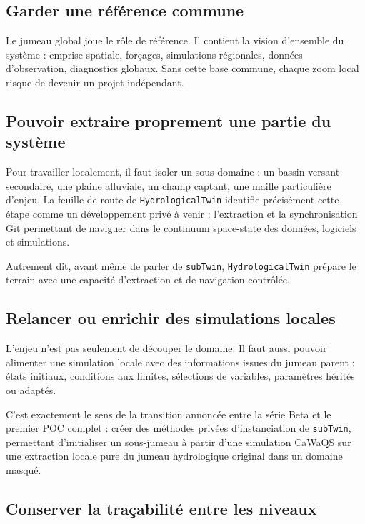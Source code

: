 \documentclass[11pt,a4paper]{article}
\newcommand{\hydrot}{\texttt{HydrologicalTwin}}
\begin{document}
\subsection{Garder une référence commune}

Le jumeau global joue le rôle de référence. Il contient la vision d'ensemble du système : emprise spatiale, forçages, simulations régionales, données d'observation, diagnostics globaux. Sans cette base commune, chaque zoom local risque de devenir un projet indépendant.

\subsection{Pouvoir extraire proprement une partie du système}

Pour travailler localement, il faut isoler un sous-domaine : un bassin versant secondaire, une plaine alluviale, un champ captant, une maille particulière d'enjeu. La feuille de route de \hydrot{} identifie précisément cette étape comme un développement privé à venir : l'extraction et la synchronisation Git permettant de naviguer dans le continuum space-state des données, logiciels et simulations.

Autrement dit, avant même de parler de \texttt{subTwin}, \hydrot{} prépare le terrain avec une capacité d'extraction et de navigation contrôlée.

\subsection{Relancer ou enrichir des simulations locales}

L'enjeu n'est pas seulement de découper le domaine. Il faut aussi pouvoir alimenter une simulation locale avec des informations issues du jumeau parent : états initiaux, conditions aux limites, sélections de variables, paramètres hérités ou adaptés.

C'est exactement le sens de la transition annoncée entre la série Beta et le premier POC complet : créer des méthodes privées d'instanciation de \texttt{subTwin}, permettant d'initialiser un sous-jumeau à partir d'une simulation CaWaQS sur une extraction locale pure du jumeau hydrologique original dans un domaine masqué.

\subsection{Conserver la traçabilité entre les niveaux}
\end{document}
